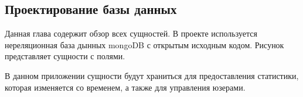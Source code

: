 \subsection{Проектирование базы данных}

Данная глава содержит обзор всех сущностей. В проекте используется нереляционная база дынных mongoDB с открытым исходным кодом. Рисунок представляет сущности с полями.

В данном приложении сущности будут храниться для предоставления статистики, которая изменяется со временем, а также для управления юзерами.

